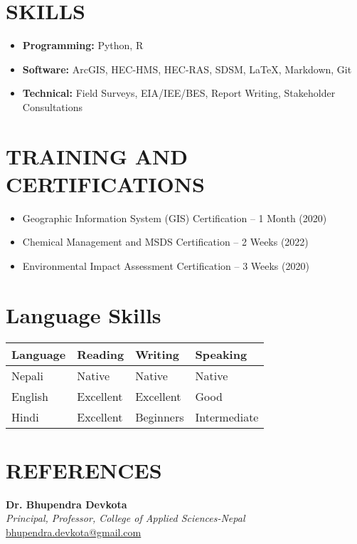 \documentclass[a4paper, 09pt]{extarticle}
\begin{document}
\vspace{5pt}
\section*{SKILLS}
\begin{itemize}
    \item \textbf{Programming:} Python, R
    \item \textbf{Software:} ArcGIS, HEC-HMS, HEC-RAS, SDSM, LaTeX, Markdown, Git
    \item \textbf{Technical:} Field Surveys, EIA/IEE/BES, Report Writing, Stakeholder Consultations
\end{itemize}

\section*{TRAINING AND CERTIFICATIONS}
\begin{itemize}
    \item Geographic Information System (GIS) Certification – 1 Month (2020)
    \item Chemical Management and MSDS Certification – 2 Weeks (2022)
    \item Environmental Impact Assessment Certification – 3 Weeks (2020)
\end{itemize}

\section*{Language Skills}

\noindent
\begin{tabularx}{\textwidth}{|l|X|X|X|}
\hline
\textbf{Language} & \textbf{Reading} & \textbf{Writing} & \textbf{Speaking} \\ \hline
Nepali & Native & Native & Native \\ \hline
English & Excellent & Excellent & Good \\ \hline
Hindi & Excellent & Beginners & Intermediate \\ \hline
\end{tabularx}

\section*{REFERENCES}

\noindent
\textbf{Dr. Bhupendra Devkota}\\[2pt]
\textit{Principal, Professor, College of Applied Sciences-Nepal}\\
\href{mailto:bhupendra.devkota@gmail.com}{bhupendra.devkota@gmail.com}
\end{document}
